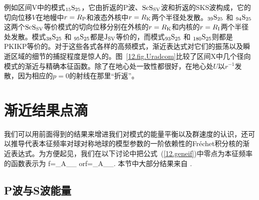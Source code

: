例如区间V中的模式${}_{15}{\rm S}_{25}$，它由折返的P波、${\rm ScS}_{\rm SV}$波和折返的SKS波构成，它的切向位移$V$在地幔中$r=R_{\rm P}$和液态外核中$r=R_{\rm K}$两个半径处发散。${}_{39}{\rm S}_{25}$ 和 ${}_{94}{\rm S}_{25}$这两个${\rm ScS}_{\rm SV}$等价模式的切向位移分别在外核的$r=R_{\rm K}$和内核的$r=R_{\rm I}$两个半径处发散。模式${}_{38}{\rm S}_{25}$ 和 ${}_{95}{\rm S}_{25}$都是${\rm J}_{\rm SV}$等价的，而模式${}_{93}{\rm S}_{25}$ 和 ${}_{180}{\rm S}_{25}$则都是PKIKP等价的。对于这些各式各样的高频模式，渐近表达式对它们的振荡以及瞬逝区域的细节的捕捉程度是惊人的。图~\ref{12.fig.Uradcom}比较了区间X中几个径向模式的渐近与精确本征函数。除了在地心处一致性都很好，在地心处$U$以$r^{-1}$发散，因为相应的$p=0$的射线在那里“折返”。
%

\renewcommand{\thesection}{$\!\!\!\raise1.3ex\hbox{$\star$}\!\!$
\arabic{chapter}.\arabic{section}}
\section{渐近结果点滴}
\renewcommand{\thesection}{\arabic{chapter}.\arabic{section}}

我们可以用前面得到的结果来增进我们对模式的能量平衡以及群速度的认识，还可以推导代表本征频率对球对称地球的模型参数的一阶依赖性的Fr\'{e}chet积分核的渐近表达式。为方便起见，我们在以下讨论中把公式~(\ref{12.geneif})中零点为本征频率的函数表示为
\eq
f=\sum_{\nu}A_{\nu}\sin\half\Psi_{\nu}\qquad
\mbox{or}\qquad f=\sum_{\nu}A_{\nu}\cos\half\Psi_{\nu}.
\en
本节中大部分结果来自 \textcite{zhao&dahlen95b}.

\renewcommand{\thesubsection}{$\!\!\!\raise1.3ex\hbox{$\star$}\!\!$
\arabic{chapter}.\arabic{section}.\arabic{subsection}}
\subsection{P波与S波能量}
%
%
%
%
%
%
\renewcommand{\thesubsection}{\arabic{chapter}.\arabic{section}.\arabic{subsection}}

